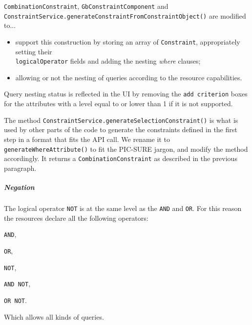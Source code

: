 \verb|CombinationConstraint|, \verb|GbConstraintComponent| and \\
\verb|ConstraintService.generateConstraintFromConstraintObject()| are modified to...
\begin{itemize}
    \item support this construction by storing an array of \verb|Constraint|, appropriately setting their \\
    \verb|logicalOperator| fields and adding the nesting \emph{where} clauses;
    \item allowing or not the nesting of queries according to the resource capabilities.
\end{itemize}
Query nesting status is reflected in the UI by removing the \verb|add criterion| boxes for the attributes with a level equal to or lower than 1 if it is not supported.

The method \verb|ConstraintService.generateSelectionConstraint()| is what is used by other parts of the code to generate the constraints defined in the first step in a format that fits the API call.
We rename it to \verb|generateWhereAttribute()| to fit the PIC-SURE jargon, and modify the method accordingly.
It returns a \verb|CombinationConstraint| as described in the previous paragraph.

\subparagraph{Negation}
The logical operator \verb|NOT| is at the same level as the \verb|AND| and \verb|OR|.
For this reason the resources declare all the following operators:
\begin{enumerate*}[label=(\arabic*)]
  \item \verb|AND|,
  \item \verb|OR|,
  \item \verb|NOT|,
  \item \verb|AND NOT|,
  \item \verb|OR NOT|.
\end{enumerate*}
Which allows all kinds of queries.


